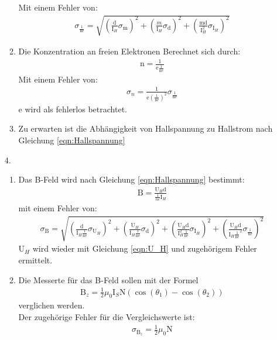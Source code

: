 \documentclass[12pt]{scrartcl}
\begin{document}
\begin{enumerate}
\begin{enumerate}
Mit einem Fehler von:
\begin{align}
\sigma_{\frac{1}{\text{ne}}} = 
\sqrt{\left(\frac{\text{d}}
{\text{I}_H}\sigma_{\text{m}}\right)^2+
\left(\frac{m}
{\text{I}_H}\sigma_{\text{d}}\right)^2+
\left(\frac{\text{m} \text{d}}
{\text{I}_H^2}\sigma_{\text{I}_H}\right)^2}
\label{eqn:Hallspannung_Fehler}
\end{align}
\item
Die Konzentration an freien Elektronen Berechnet sich durch:
\begin{align}
\text{n} = \frac{1}{\text{e}\frac{1}{\text{ne}}}
\end{align}
Mit einem Fehler von:
\begin{align}
\sigma_n = \frac{1}{\text{e}\left(\frac{1}{\text{ne}}\right)^2}\sigma_{\frac{1}{\text{ne}}}
\end{align}
e wird als fehlerlos betrachtet.
\item
Zu erwarten ist die Abhängigkeit von Hallspannung zu Hallstrom nach Gleichung \ref{eqn:Hallspannung}
\end{enumerate}
\item[4.]
\begin{enumerate}
\item
Das B-Feld wird nach Gleichung \ref{eqn:Hallspannung} bestimmt:
\begin{align*}
 \text{B}= \frac{\text{U}_H \text{d}}{\frac{1}{ne} \text{I}_H}
\end{align*}
mit einem Fehler von:
\begin{align}
\sigma_{\text{B}} = 
\sqrt{\left(\frac{\text{d}}
{\text{I}_H \frac{1}{\text{ne}}}\sigma_{\text{U}_H}\right)^2+
\left(\frac{\text{U}_H}
{\text{I}_H \frac{1}{\text{ne}}}\sigma_{\text{d}}\right)^2+
\left(\frac{\text{U}_H \text{d}}
{\text{I}_H^2 \frac{1}{\text{ne}}}\sigma_{\text{I}_H}\right)^2+
\left(\frac{\text{U}_H \text{d}}
{\text{I}_H \frac{1}{\text{ne}}^2}\sigma_{\frac{1}{\text{ne}}}\right)^2}
\end{align}
U$_H$ wird wieder mit Gleichung \ref{eqn:U_H}
und zugehörigem Fehler ermittelt.
\item
Die Messerte für das B-Feld sollen mit der Formel
\begin{align}
\text{B}_z = \frac{1}{2} \mu_0 \text{I}_S \text{N} (\cos(\theta_1) - \cos(\theta_2))
\label{eqn:Aufgabe 3_TD_B-Feld_1} 
\end{align}
verglichen werden.\\
Der zugehörige Fehler für die Vergleichswerte ist:
\begin{align}
\sigma_{\text{B}_z} = \frac{1}{2} \mu_0 \text{N}

\end{align}
\end{enumerate}
\end{enumerate}
\end{document}
